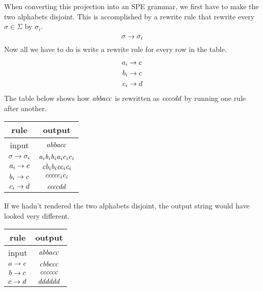 \begin{examplebox}
    When converting this projection into an SPE grammar, we first have to make the two alphabets disjoint.
    This is accomplished by a rewrite rule that rewrite every $\sigma \in \Sigma$ by $\sigma_i$.
    \[
        \sigma \rightarrow \sigma_i
    \]
    Now all we have to do is write a rewrite rule for every row in the table.
    \begin{align*}
        a_i &\rightarrow c\\
        b_i &\rightarrow c\\
        c_i &\rightarrow d
    \end{align*}
    The table below shows how $\mathit{abbacc}$ is rewritten as $\mathit{ccccdd}$ by running one rule after another.
    \begin{center}
        \begin{tabular}{cc}
            \toprule
            \textbf{rule} & \textbf{output}\\
            \midrule
            input & $\mathit{abbacc}$\\
            $\sigma \rightarrow \sigma_i$ & $\mathit{a_i b_i b_i a_i c_i c_i}$\\
            $a_i \rightarrow c$ & $\mathit{c b_i b_i c c_i c_i}$\\
            $b_i \rightarrow c$ & $\mathit{c c c c c_i c_i}$\\
            $c_i \rightarrow d$ & $\mathit{c c c c d d}$\\
            \bottomrule
        \end{tabular}
    \end{center}
    If we hadn't rendered the two alphabets disjoint, the output string would have looked very different.
    \begin{center}
        \begin{tabular}{cc}
            \toprule
            \textbf{rule} & \textbf{output}\\
            \midrule
            input & $\mathit{abbacc}$\\
            $a \rightarrow c$ & $\mathit{c b b c c c}$\\
            $b \rightarrow c$ & $\mathit{c c c c c c}$\\
            $c \rightarrow d$ & $\mathit{d d d d d d}$\\
            \bottomrule
        \end{tabular}
    \end{center}
\end{examplebox}

